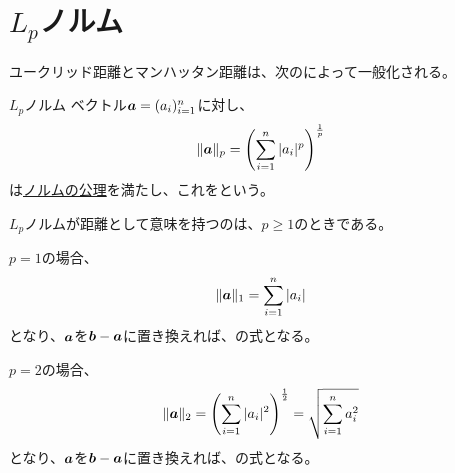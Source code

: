 \documentclass[../../../topic_linear-algebra]{subfiles}
\begin{document}
\sectionline
\section{$L_p$ノルム}

ユークリッド距離とマンハッタン距離は、次のによって一般化される。

\begin{definition*}{$L_p$ノルム}
  ベクトル$\vb*{a} = (a_i)_{i=1}^n$に対し、
  \begin{equation*}
    \|\vb*{a}\|_p = \left( \sum_{i=1}^n |a_i|^p \right)^{\frac{1}{p}}
  \end{equation*}
  は\hyperref[def:norm-axioms]{ノルムの公理}を満たし、これをという。
\end{definition*}

$L_p$ノルムが距離として意味を持つのは、$p \geq 1$のときである。

\br

$p=1$の場合、
\begin{equation*}
  \|\vb*{a}\|_1 = \sum_{i=1}^n |a_i|
\end{equation*}
となり、$\vb*{a}$を$\vb*{b}-\vb*{a}$に置き換えれば、の式となる。

\br

$p=2$の場合、
\begin{equation*}
  \|\vb*{a}\|_2 = \left( \sum_{i=1}^n |a_i|^2 \right)^{\frac{1}{2}} = \sqrt{\sum_{i=1}^n a_i^2}
\end{equation*}
となり、$\vb*{a}$を$\vb*{b}-\vb*{a}$に置き換えれば、の式となる。
\end{document}
